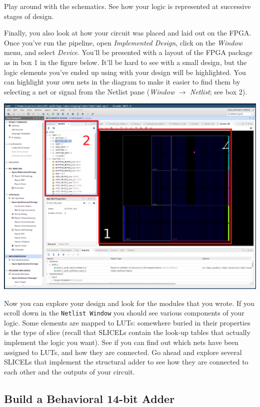 \documentclass[11pt]{article}
\begin{document}
Play around with the schematics. See how your logic is represented at successive stages of design.

Finally, you also look at how your circuit was placed and laid out on the FPGA. Once you've run the pipeline, open \emph{Implemented Design}, click on the \emph{Window} menu, and select \emph{Device}. You'll be presented with a layout of the FPGA package as in box 1 in the figure below. It'll be hard to see with a small design, but the logic elements you've ended up using with your design will be highlighted. You can highlight your own nets in the diagram to make it easier to find them by selecting a net or signal from the Netlist pane (\emph{Window} $\rightarrow$ \emph{Netlist}; see box 2).

\begin{center}
  \includegraphics[width=\textwidth]{figs/fpga_layout.png}
\end{center}

Now you can explore your design and look for the modules that you wrote. If you scroll down in the \verb|Netlist Window| you should see various components of your logic. Some elements are mapped to LUTs: somewhere buried in their properties is the type of slice (recall that SLICELs contain the look-up tables that actually implement the logic you want). See if you can find out which nets have been assigned to LUTs, and how they are connected. Go ahead and explore several SLICELs that implement the structural adder to see how they are connected to each other and the outputs of your circuit.

\subsection{Build a Behavioral 14-bit Adder}
\end{document}
